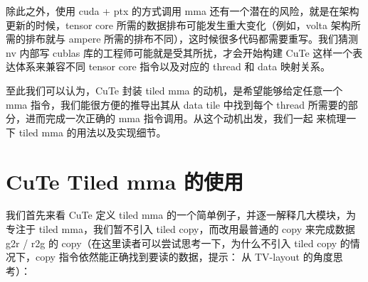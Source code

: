 除此之外，使用 cuda + ptx 的方式调用 mma 还有一个潜在的风险，就是在架构更新的时候，tensor core 所需的数据排布可能发生重大变化（例如，volta 架构所需的排布就与 ampere 所需的排布不同），这时候很多代码都需要重写。我们猜测 nv 内部写 cublas 库的工程师可能就是受其所扰，才会开始构建 CuTe 这样一个表达体系来兼容不同 tensor core 指令以及对应的 thread 和 data 映射关系。

至此我们可以认为，CuTe 封装 tiled mma 的动机，是希望能够给定任意一个 mma 指令，我们能很方便的推导出其从 data tile 中找到每个 thread 所需要的部分，进而完成一次正确的 mma 指令调用。从这个动机出发，我们一起 来梳理一下 tiled mma 的用法以及实现细节。

\section{CuTe Tiled mma 的使用}

我们首先来看 CuTe 定义 tiled mma 的一个简单例子，并逐一解释几大模块，为专注于 tiled mma，我们暂不引入 tiled copy，而改用最普通的 copy 来完成数据 g2r / r2g 的 copy（在这里读者可以尝试思考一下，为什么不引入 tiled copy 的情况下，copy 指令依然能正确找到要读的数据，提示： 从 TV-layout 的角度思考）：

